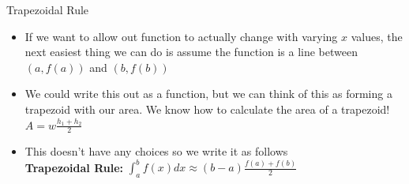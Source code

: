 {}\documentclass[letterpaper,
compress,
xcolor=x11names,
]{beamer}
\begin{document}

\begin{frame}{Trapezoidal Rule}
	\footnotesize
	\begin{itemize}
		\item If we want to allow out function to actually change with varying $x$ values, the next easiest thing we can do is assume the function is a line between $(a,f(a))$ and $(b,f(b))$
		\item<2-> We could write this out as a function, but we can think of this as forming a trapezoid with our area. We know how to calculate the area of a trapezoid! $A  = w\frac{h_1+h_2}{2}$ 
		\item<2-> This doesn't have any choices so we write it as follows\\
		\textbf{Trapezoidal Rule: } $\int_{a}^{b}f(x)dx\approx (b-a)\frac{f(a)+f(b)}{2}$
	\end{itemize}
	\begin{center}
	\end{center}
\end{frame}

\end{document}
